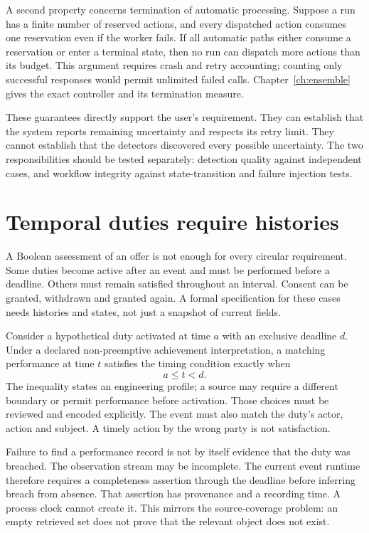 A second property concerns termination of automatic processing. Suppose a run
has a finite number of reserved actions, and every dispatched action consumes
one reservation even if the worker fails. If all automatic paths either
consume a reservation or enter a terminal state, then no run can dispatch more
actions than its budget. This argument requires crash and retry accounting;
counting only successful responses would permit unlimited failed calls.
Chapter~\ref{ch:ensemble} gives the exact controller and its termination
measure.

These guarantees directly support the user's requirement. They can establish
that the system reports remaining uncertainty and respects its retry limit.
They cannot establish that the detectors discovered every possible uncertainty.
The two responsibilities should be tested separately: detection quality against
independent cases, and workflow integrity against state-transition and failure
injection tests.

\section{Temporal duties require histories}
\label{merge:M03:11}

\label{sec:proof-temporal}
A Boolean assessment of an offer is not enough for every circular requirement.
Some duties become active after an event and must be performed before a
deadline. Others must remain satisfied throughout an interval. Consent can be
granted, withdrawn and granted again. A formal specification for these cases
needs histories and states, not just a snapshot of current fields.

Consider a hypothetical duty activated at time $a$ with an exclusive deadline
$d$. Under a declared non-preemptive achievement interpretation, a matching
performance at time $t$ satisfies the timing condition exactly when
\begin{equation}
 a\leq t<d.
 \label{eq:performance-window}
\end{equation}
The inequality states an engineering profile; a source may require a different
boundary or permit performance before activation. Those choices must be
reviewed and encoded explicitly. The event must also match the duty's actor,
action and subject. A timely action by the wrong party is not satisfaction.


Failure to find a performance record is not by itself evidence that the duty
was breached. The observation stream may be incomplete. The current event
runtime therefore requires a completeness assertion through the deadline before
inferring breach from absence. That assertion has provenance and a recording
time. A process clock cannot create it. This mirrors the source-coverage
problem: an empty retrieved set does not prove that the relevant object does
not exist.


